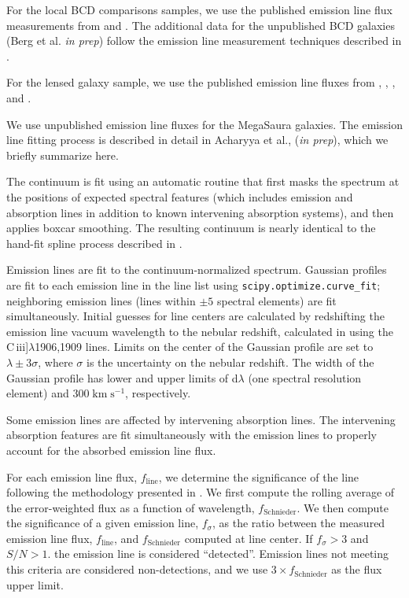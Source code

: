 \documentclass[preprint2]{aastex62}
\newcommand{\ciii}{C\,{\sc iii}]\xspace}
\newcommand{\kms}{\ensuremath{\;\mathrm{km}\;\mathrm{s}^{-1}}\xspace}
\newcommand{\mage}{{\sc Meg}a{\sc S}a{\sc ura}\xspace}
\begin{document}
For the local BCD comparisons samples, we use the published emission line flux measurements from \citet{Berg+2016} and \citet{Senchyna+2017}. The additional data for the unpublished BCD galaxies (Berg et al. \emph{in prep}) follow the emission line measurement techniques described in \citet{Berg+2016}.

For the lensed galaxy sample, we use the published emission line fluxes from \citet{Erb+2010}, \citet{Christensen+2012}, \citet{Stark+2014}, and \citet{Berg+2018}.

We use unpublished emission line fluxes for the \mage galaxies. The emission line fitting process is described in detail in Acharyya et al., (\emph{in prep}), which we briefly summarize here.

The continuum is fit using an automatic routine that first masks the spectrum at the positions of expected spectral features (which includes emission and absorption lines in addition to known intervening absorption systems), and then applies boxcar smoothing. The resulting continuum is nearly identical to the hand-fit spline process described in \citet{Rigby+2018a}.

Emission lines are fit to the continuum-normalized spectrum. Gaussian profiles are fit to each emission line in the line list using {\tt scipy.optimize.curve\_fit}; neighboring emission lines (lines within $\pm 5$ spectral elements) are fit simultaneously. Initial guesses for line centers are calculated by redshifting the emission line vacuum wavelength to the nebular redshift, calculated in \citet{Rigby+2018a} using the \ciii$\lambda$1906,1909 lines. Limits on the center of the Gaussian profile are set to $\lambda \pm 3\sigma$, where $\sigma$ is the uncertainty on the nebular redshift. The width of the Gaussian profile has lower and upper limits of d$\lambda$ (one spectral resolution element) and 300\kms, respectively.

Some emission lines are affected by intervening absorption lines. The intervening absorption features are fit simultaneously with the emission lines to properly account for the absorbed emission line flux.

For each emission line flux, $f_{\mathrm{line}}$, we determine the significance of the line following the methodology presented in \citet{Schnieider+1993}. We first compute the rolling average of the error-weighted flux as a function of wavelength, $f_{\mathrm{Schnieder}}$. We then compute the significance of a given emission line, $f_{\sigma}$, as the ratio between the measured emission line flux, $f_{\mathrm{line}}$, and $f_{\mathrm{Schnieder}}$ computed at line center. If $f_{\sigma}>3$ and $S/N > 1$. the emission line is considered ``detected''. Emission lines not meeting this criteria are considered non-detections, and we use $3\times f_{\mathrm{Schnieder}}$ as the flux upper limit.
\end{document}
